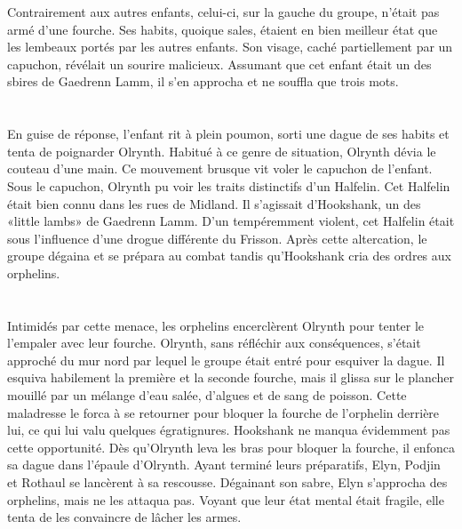 \documentclass[main.tex]{subfiles}
\begin{document}
    Contrairement aux autres enfants, celui-ci, sur la gauche du groupe, n'était pas armé d'une fourche.
    Ses habits, quoique sales, étaient en bien meilleur état que les lembeaux portés par les autres enfants.
    Son visage, caché partiellement par un capuchon, révélait un sourire malicieux.
    Assumant que cet enfant était un des sbires de Gaedrenn Lamm, il s'en approcha et ne souffla que trois mots.\\
    \\
    \\
    En guise de réponse, l'enfant rit à plein poumon, sorti une dague de ses habits et tenta de poignarder Olrynth.
    Habitué à ce genre de situation, Olrynth dévia le couteau d'une main.
    Ce mouvement brusque vit voler le capuchon de l'enfant.
    Sous le capuchon, Olrynth pu voir les traits distinctifs d'un Halfelin.
    Cet Halfelin était bien connu dans les rues de Midland.
    Il s'agissait d'Hookshank, un des «little lambs» de Gaedrenn Lamm.
    D'un tempéremment violent, cet Halfelin était sous l'influence d'une drogue différente du Frisson.
    Après cette altercation, le groupe dégaina et se prépara au combat tandis qu'Hookshank cria des ordres aux orphelins.\\
    \\
    \\
    Intimidés par cette menace, les orphelins encerclèrent Olrynth pour tenter le l'empaler avec leur fourche.
    Olrynth, sans réfléchir aux conséquences, s'était approché du mur nord par lequel le groupe était entré pour esquiver la dague.
    Il esquiva habilement la première et la seconde fourche, mais il glissa sur le plancher mouillé par un mélange d'eau salée, d'algues et de sang de poisson.
    Cette maladresse le forca à se retourner pour bloquer la fourche de l'orphelin derrière lui, ce qui lui valu quelques égratignures.
    Hookshank ne manqua évidemment pas cette opportunité.
    Dès qu'Olrynth leva les bras pour bloquer la fourche, il enfonca sa dague dans l'épaule d'Olrynth.
    Ayant terminé leurs préparatifs, Elyn, Podjin et Rothaul se lancèrent à sa rescousse.
    Dégainant son sabre, Elyn s'approcha des orphelins, mais ne les attaqua pas.
    Voyant que leur état mental était fragile, elle tenta de les convaincre de lâcher les armes.
    \\
    \\
\end{document}
